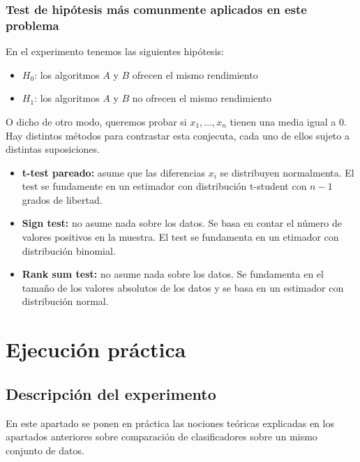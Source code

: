 \documentclass[11pt]{article}
\providecommand{\tightlist}{%
      \setlength{\itemsep}{0pt}\setlength{\parskip}{0pt}}
\begin{document}
\subsubsection{Test de hipótesis más comunmente aplicados en este
problema}\label{test-de-hipuxf3tesis-muxe1s-comunmente-aplicados-en-este-problema}

En el experimento tenemos las siguientes hipótesis:

\begin{itemize}
\tightlist
\item
  \(H_0\): los algoritmos \(A\) y \(B\) ofrecen el mismo rendimiento
\item
  \(H_1\): los algoritmos \(A\) y \(B\) no ofrecen el mismo rendimiento
\end{itemize}

O dicho de otro modo, queremos probar si \(x_1,...,x_n\) tienen una
media igual a 0. Hay distintos métodos para contrastar esta conjecuta,
cada uno de ellos sujeto a distintas suposiciones.

\begin{itemize}
\tightlist
\item
  \textbf{t-test pareado:} asume que las diferencias \(x_i\) se
  distribuyen normalmenta. El test se fundamente en un estimador con
  distribución t-student con \(n-1\) grados de libertad.
\item
  \textbf{Sign test:} no asume nada sobre los datos. Se basa en contar
  el número de valores positivos en la muestra. El test se fundamenta en
  un etimador con distribución binomial.
\item
  \textbf{Rank sum test:} no asume nada sobre los datos. Se fundamenta
  en el tamaño de los valores absolutos de los datos y se basa en un
  estimador con distribución normal.
\end{itemize}

    \section{Ejecución práctica}\label{ejecuciuxf3n-pruxe1ctica}

\subsection{Descripción del
experimento}\label{descripciuxf3n-del-experimento}

En este apartado se ponen en práctica las nociones teóricas explicadas
en los apartados anteriores sobre comparación de clasificadores sobre un
mismo conjunto de datos.
\end{document}
